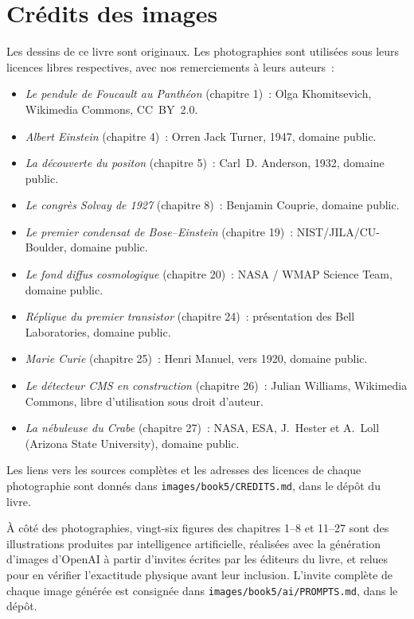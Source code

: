 \chapter*{Crédits des images}

Les dessins de ce livre sont originaux. Les photographies sont
utilisées sous leurs licences libres respectives, avec nos
remerciements à leurs auteurs~:

\begin{itemize}
  \item \emph{Le pendule de Foucault au Panthéon} (chapitre 1)~:
        Olga Khomitsevich, Wikimedia Commons, CC~BY~2.0.
  \item \emph{Albert Einstein} (chapitre 4)~: Orren Jack Turner,
        1947, domaine public.
  \item \emph{La découverte du positon} (chapitre 5)~: Carl~D.
        Anderson, 1932, domaine public.
  \item \emph{Le congrès Solvay de 1927} (chapitre 8)~: Benjamin
        Couprie, domaine public.
  \item \emph{Le premier condensat de Bose--Einstein}
        (chapitre 19)~: NIST/JILA/CU-Boulder, domaine public.
  \item \emph{Le fond diffus cosmologique} (chapitre 20)~:
        NASA / WMAP Science Team, domaine public.
  \item \emph{Réplique du premier transistor} (chapitre 24)~:
        présentation des Bell Laboratories, domaine public.
  \item \emph{Marie Curie} (chapitre 25)~: Henri Manuel, vers 1920,
        domaine public.
  \item \emph{Le détecteur CMS en construction} (chapitre 26)~:
        Julian Williams, Wikimedia Commons, libre d'utilisation sous
        droit d'auteur.
  \item \emph{La nébuleuse du Crabe} (chapitre 27)~: NASA, ESA,
        J.~Hester et A.~Loll (Arizona State University), domaine
        public.
\end{itemize}

Les liens vers les sources complètes et les adresses des licences de
chaque photographie sont donnés dans
\texttt{images/book5/CREDITS.md}, dans le dépôt du livre.

\bigskip
À côté des photographies, vingt-six figures des chapitres 1--8 et
11--27 sont des illustrations produites par intelligence
artificielle, réalisées avec la génération d'images d'OpenAI à partir
d'invites écrites par les éditeurs du livre, et relues pour en
vérifier l'exactitude physique avant leur inclusion. L'invite
complète de chaque image générée est consignée dans
\texttt{images/book5/ai/PROMPTS.md}, dans le dépôt.
\clearpage
